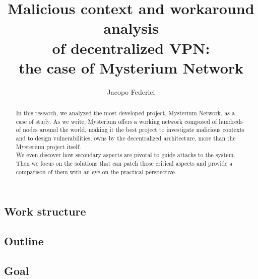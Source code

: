 \documentclass[12pt]{article}
\title{Malicious context and workaround analysis\\of decentralized VPN:\\the case of Mysterium Network}
\author{Jacopo Federici}
\begin{document}
	\raggedright
	\maketitle	
	\clearpage
	
	\tableofcontents{}
	\pagebreak

	\begin{abstract}
    
    In this research, we analyzed the most developed project, Mysterium Network, as a case of study. As we write, Mysterium offers a working network composed of hundreds of nodes around the world, making it the best project to investigate malicious contexts and to design vulnerabilities, owns by the decentralized architecture, more than the Mysterium project itself.\\
	We even discover how secondary aspects are pivotal to guide attacks to the system.\\
    Then we focus on the solutions that can patch those critical aspects and provide a comparison of them with an eye on the practical perspective.
		
	\end{abstract}
	\pagebreak

	\subsection{Work structure}
	\subsection{Outline}
	\subsection{Goal}
\end{document}
